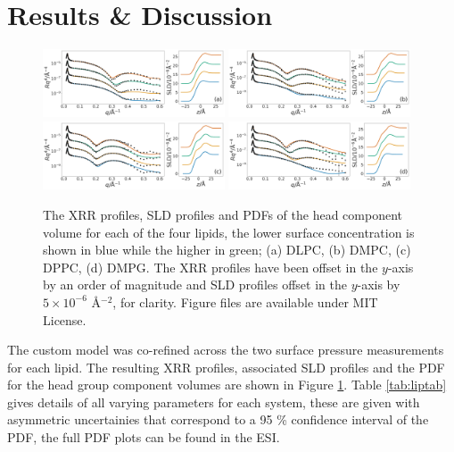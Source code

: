 \documentclass[twoside,twocolumn,9pt]{article}
\begin{document}
\section{Results \& Discussion}
\begin{figure}
	\centering
	\includegraphics[width=0.48\textwidth]{figures/DLPC_all_data}
	\includegraphics[width=0.48\textwidth]{figures/DMPC_all_data}
	\includegraphics[width=0.48\textwidth]{figures/DPPC_all_data}
	\includegraphics[width=0.48\textwidth]{figures/DMPG_all_data}
	\caption{The XRR profiles, SLD profiles and PDFs of the head component volume for each of the four lipids, the lower surface concentration is shown in blue while the higher in green; (a) DLPC, (b) DMPC, (c) DPPC, (d) DMPG. The XRR profiles have been offset in the $y$-axis by an order of magnitude and SLD profiles offset in the $y$-axis by $5\times10^{-6}$ \AA$^{-2}$, for clarity. Figure files are available under MIT License.\cite{mccluskey_2018}}
	\label{fig:lipids}
\end{figure}
The custom model was co-refined across the two surface pressure measurements for each lipid. The resulting XRR profiles, associated SLD profiles and the PDF for the head group component volumes are shown in Figure \ref{fig:lipids}. Table \ref{tab:liptab} gives details of all varying parameters for each system, these are given with asymmetric uncertainies that correspond to a 95 \% confidence interval of the PDF, the full PDF plots can be found in the ESI. 
\end{document}
